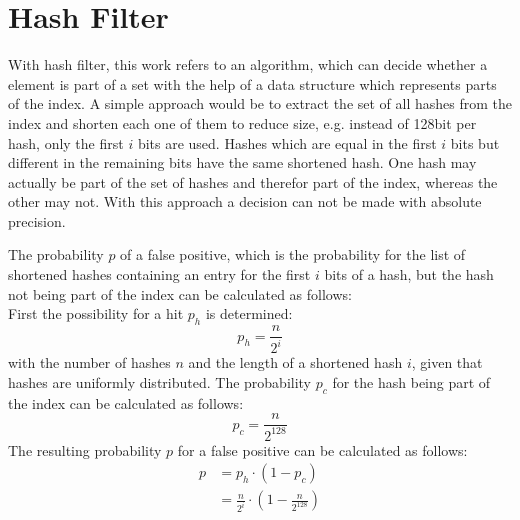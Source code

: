 \section{Hash Filter}\label{section:implementation/hash_filter}
With hash filter, this work refers to an algorithm, which can decide whether a element is part of a set with the help of a data structure which represents parts of the index.
A simple approach would be to extract the set of all hashes from the index and shorten each one of them to reduce size, e.g. instead of 128bit per hash, only the first $i$ bits are used.
Hashes which are equal in the first $i$ bits but different in the remaining bits have the same shortened hash.
One hash may actually be part of the set of hashes and therefor part of the index, whereas the other may not.
With this approach a decision can not be made with absolute precision.

The probability $p$ of a false positive, which is the probability for the list of shortened hashes containing an entry for the first $i$ bits of a hash, but the hash not being part of the index can be calculated as follows:\\
First the possibility for a hit $p_h$ is determined:
\begin{equation}
	p_h=\frac{n}{2^i}
\end{equation}
with the number of hashes $n$ and the length of a shortened hash $i$, given that hashes are uniformly distributed.
The probability $p_c$ for the hash being part of the index can be calculated as follows:
\begin{equation}
	p_c=\frac{n}{2^{128}}
\end{equation}
The resulting probability $p$ for a false positive can be calculated as follows:
\begin{equation}
	\begin{split}
		p&=p_h\cdot (1-p_c) \\[10pt]
		&= \frac{n}{2^i}\cdot \left(1-\frac{n}{2^{128}}\right)
	\end{split}
\end{equation}

